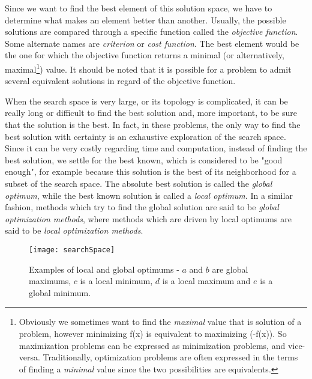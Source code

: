 Since we want to find the best element of this solution space, we have to determine what makes an element better than another. Usually, the possible solutions are compared through a specific function called the \emph{objective function}. Some alternate names are \emph{criterion} or \emph{cost function}. The best element would be the one for which the objective function returns a minimal (or alternatively, maximal\footnote{Obviously we sometimes want to find the \emph{maximal} value that is solution of a problem, however minimizing f(x) is equivalent to maximizing (-f(x)). So maximization problems can be expressed as minimization problems, and vice-versa. Traditionally, optimization problems are often expressed in the terms of finding a \emph{minimal} value since the two possibilities are equivalents.}) value. It should be noted that it is possible for a problem to admit several equivalent solutions in regard of the objective function.


When the search space is very large, or its topology is complicated, it can be really long or difficult to find the best solution and, more important, to be sure that the solution is the best. In fact, in these problems, the only way to find the best solution with certainty is an exhaustive exploration of the search space. Since it can be very costly regarding time and computation, instead of finding the best solution, we settle for the best known, which is considered to be "good enough", for example because this solution is the best of its neighborhood for a subset of the search space. The absolute best solution is called the \emph{global optimum}, while the best known solution is called a \emph{local optimum}. In a similar fashion, methods which try to find the global solution are said to be \emph{global optimization methods}, where methods which are driven by local optimums are said to be \emph{local optimization methods}.


\begin{figure}
\centering
\texttt{[image: searchSpace]}
\caption{Examples of local and global optimums - $a$ and $b$ are global maximums, $c$ is a local minimum, $d$ is a local maximum and $e$ is a global minimum.}
\label{localAndGlobalOptims}
\end{figure}

